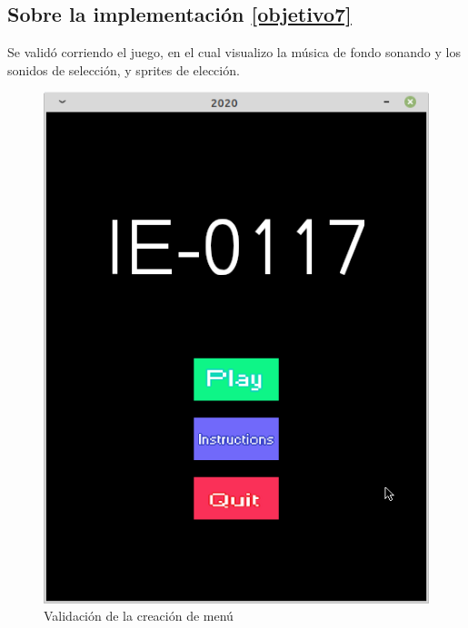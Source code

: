 \documentclass[12pt,letterpaper]{article}
\begin{document}
\subsection{Sobre la implementación \ref{objetivo7}}
Se validó corriendo el juego, en el cual visualizo la música de fondo sonando y los sonidos de selección, y sprites de elección.
\begin{figure}[H]
    \centering
    \includegraphics[width=0.7\linewidth]{Menu.png}
    \caption{Validación de la creación de menú}
    \label{05}
\end{figure}
\end{document}
